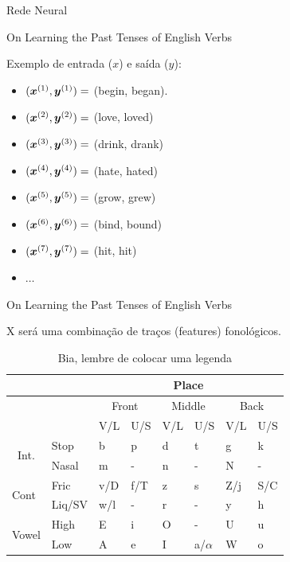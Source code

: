 \documentclass[10pt]{beamer}
\begin{document}
\begin{frame}[fragile]{Rede Neural}

\end{frame}


\begin{frame}[fragile]{On Learning the Past Tenses of English Verbs}

Exemplo de entrada ($x$) e saída ($y$):

\begin{itemize}
\item [] $(\bm{x}^{(1)}, \bm{y}^{(1)}) =$ (begin, began).
\item [] $(\bm{x}^{(2)}, \bm{y}^{(2)}) =$ (love, loved)
\item [] $(\bm{x}^{(3)}, \bm{y}^{(3)}) =$ (drink, drank)
\item [] $(\bm{x}^{(4)}, \bm{y}^{(4)}) =$ (hate, hated)
\item [] $(\bm{x}^{(5)}, \bm{y}^{(5)}) =$ (grow, grew)
\item [] $(\bm{x}^{(6)}, \bm{y}^{(6)}) =$ (bind, bound)
\item [] $(\bm{x}^{(7)}, \bm{y}^{(7)}) =$ (hit, hit)
\item [] $\dots$
\end{itemize}


\end{frame}


\begin{frame}[fragile]{On Learning the Past Tenses of English Verbs}

X será uma combinação de traços (features) fonológicos.

\begin{table}[]
\centering
\caption{Bia, lembre de colocar uma legenda}
\label{fontable}
\begin{tabular}{llllllll}
\hline
 &  & \multicolumn{6}{c}{Place} \\ \hline
 &  & \multicolumn{2}{c|}{Front} & \multicolumn{2}{c|}{Middle} & \multicolumn{2}{c}{Back} \\ \hline
 &  & \multicolumn{1}{l|}{V/L} & \multicolumn{1}{l|}{U/S} & \multicolumn{1}{l|}{V/L} & \multicolumn{1}{l|}{U/S} & \multicolumn{1}{l|}{V/L} & U/S \\ \hline
 \multicolumn{1}{c}{\multirow{2}{*}{Int.}} & Stop & b & p & d & t & g & k \\ \cline{2-8} 
\multicolumn{1}{c}{} & Nasal & m & - & n & - & N & - \\ \hline
\multirow{2}{*}{Cont} & Fric & v/D & f/T & z & s & Z/j & S/C \\ \cline{2-8} 
 & Liq/SV & w/l & - & r & - & y & h \\ \hline
 \multirow{2}{*}{Vowel} & High & E & i & O & - & U & u \\ \cline{2-8} 
 & Low & A & e & I & a/$\alpha$ & W & o \\ \hline
\end{tabular}
\end{table}
\end{frame}
\end{document}
